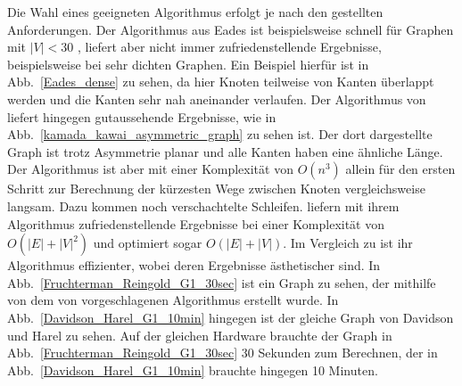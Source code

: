 \documentclass[12pt, a4paper]{article}
\begin{document}
Die Wahl eines geeigneten Algorithmus erfolgt je nach den gestellten Anforderungen. Der Algorithmus aus Eades ist beispielsweise schnell für Graphen mit $|V| < 30$ \cite[S.~150]{eades1984heuristic}, liefert aber nicht immer zufriedenstellende Ergebnisse, beispielsweise bei sehr dichten Graphen. Ein Beispiel hierfür ist in Abb.~\ref{Eades_dense} zu sehen, da hier Knoten teilweise von Kanten überlappt werden und die Kanten sehr nah aneinander verlaufen. Der Algorithmus von  liefert hingegen gutaussehende Ergebnisse, wie in Abb.~\ref{kamada_kawai_asymmetric_graph} zu sehen ist. Der dort dargestellte Graph ist trotz Asymmetrie planar und alle Kanten haben eine ähnliche Länge. Der Algorithmus ist aber mit einer Komplexität von $O(n^3)$ allein für den ersten Schritt zur Berechnung der kürzesten Wege zwischen Knoten vergleichsweise langsam. Dazu kommen noch verschachtelte Schleifen.  liefern mit ihrem Algorithmus zufriedenstellende Ergebnisse bei einer Komplexität von $O(|E| + |V|^2)$ und optimiert sogar $O(|E| + |V|)$. Im Vergleich zu  ist ihr Algorithmus effizienter, wobei deren Ergebnisse ästhetischer sind. In Abb.~\ref{Fruchterman_Reingold_G1_30sec} ist ein Graph zu sehen, der mithilfe von dem von  vorgeschlagenen Algorithmus erstellt wurde. In Abb.~\ref{Davidson_Harel_G1_10min} hingegen ist der gleiche Graph von Davidson und Harel zu sehen. Auf der gleichen Hardware brauchte der Graph in Abb.~\ref{Fruchterman_Reingold_G1_30sec} 30 Sekunden zum Berechnen, der in Abb.~\ref{Davidson_Harel_G1_10min} brauchte hingegen 10 Minuten.\\
\end{document}
